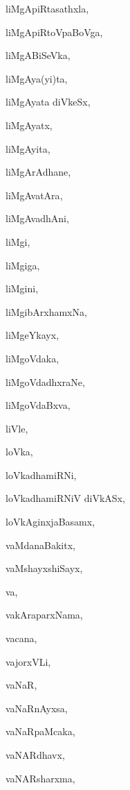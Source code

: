 \begin{multicols}{2}
{liMgApiRtasathxla}, \pageref{liMgApiRtasathxla}

{liMgApiRtoVpaBoVga}, \pageref{liMgApiRtoVpaBoVga}

{liMgABiSeVka}, \pageref{liMgABiSeVka}

{liMgAya(yi)ta}, \pageref{liMgAyayita}

{liMgAyata diVkeSx}, \pageref{liMgAyatadiVkeSx}

{liMgAyatx}, \pageref{liMgAyatx}

{liMgAyita}, \pageref{liMgAyita}

{liMgArAdhane}, \pageref{liMgArAdhane}

{liMgAvatAra}, \pageref{liMgAvatAra}

{liMgAvadhAni}, \pageref{liMgAvadhAni}

{liMgi}, \pageref{liMgi}

{liMgiga}, \pageref{liMgiga}

{liMgini}, \pageref{liMgini}

{liMgibArxhamxNa}, \pageref{liMgibArxhamxNa}

{liMgeYkayx}, \pageref{liMgeYkayx}

{liMgoVdaka}, \pageref{liMgoVdaka}

{liMgoVdadhxraNe}, \pageref{liMgoVdadhxraNe}

{liMgoVdaBxva}, \pageref{liMgoVdaBxva}

{liVle}, \pageref{liVle}

{loVka}, \pageref{loVka}

{loVkadhamiRNi}, \pageref{loVkadhamiRNi}

{loVkadhamiRNiV diVkASx}, \pageref{loVkadhamiRNiVdiVkASx}

{loVkAginxjaBasamx}, \pageref{loVkAginxjaBasamx}

{vaMdanaBakitx}, \pageref{vaMdanaBakitx}

{vaMshayxshiSayx}, \pageref{vaMshayxshiSayx}

{va}, \pageref{va}

{vakAraparxNama}, \pageref{vakAraparxNama}

{vacana}, \pageref{vacana}

{vajorxVLi}, \pageref{vajorxVLi}

{vaNaR}, \pageref{vaNaR}

{vaNaRnAyxsa}, \pageref{vaNaRnAyxsa}

{vaNaRpaMcaka}, \pageref{vaNaRpaMcaka}

{vaNARdhavx}, \pageref{vaNARdhavx}

{vaNARsharxma}, \pageref{vaNARsharxma}


\end{multicols}
